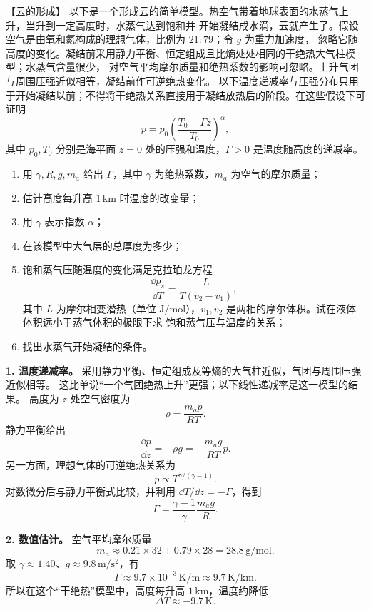 {
\begin{origexamplebox}{【云的形成】}\label{ch17:ex:s31-22-6}
以下是一个形成云的简单模型。热空气带着地球表面的水蒸气上升，当升到一定高度时，水蒸气达到饱和并
开始凝结成水滴，云就产生了。假设空气是由氧和氮构成的理想气体，比例为 $21:79$；令 $g$ 为重力加速度，
忽略它随高度的变化。凝结前采用静力平衡、恒定组成且比熵处处相同的干绝热大气柱模型；水蒸气含量很少，
对空气平均摩尔质量和绝热系数的影响可忽略。上升气团与周围压强近似相等，凝结前作可逆绝热变化。
以下温度递减率与压强分布只用于开始凝结以前；不得将干绝热关系直接用于凝结放热后的阶段。在这些假设下可证明
\[
  p=p_0\left(\frac{T_0-\Gamma z}{T_0}\right)^\alpha,
\]
其中 $p_0,T_0$ 分别是海平面 $z=0$ 处的压强和温度，$\Gamma>0$ 是温度随高度的递减率。
\begin{enumerate}[label=\arabic*.]
  \item 用 $\gamma,R,g,m_a$ 给出 $\Gamma$，其中 $\gamma$ 为绝热系数，$m_a$ 为空气的摩尔质量；
  \item 估计高度每升高 $1\,\mathrm{km}$ 时温度的改变量；
  \item 用 $\gamma$ 表示指数 $\alpha$；
  \item 在该模型中大气层的总厚度为多少；
  \item 饱和蒸气压随温度的变化满足克拉珀龙方程
  \[
    \frac{\dd p_s}{\dd T}=\frac{L}{T(v_2-v_1)},
  \]
  其中 $L$ 为摩尔相变潜热（单位 $\mathrm{J/mol}$），$v_1,v_2$ 是两相的摩尔体积。试在液体体积远小于蒸气体积的极限下求
  饱和蒸气压与温度的关系；
  \item 找出水蒸气开始凝结的条件。
\end{enumerate}

\ThQCloud
\end{origexamplebox}

\begin{xesolution}
\textbf{1. 温度递减率。} 采用静力平衡、恒定组成及等熵的大气柱近似，气团与周围压强近似相等。
这比单说“一个气团绝热上升”更强；以下线性递减率是这一模型的结果。
高度为 $z$ 处空气密度为
\[
  \rho=\frac{m_a p}{RT}.
\]
静力平衡给出
\[
  \frac{\dd p}{\dd z}=-\rho g=-\frac{m_ag}{RT}p.
\]
另一方面，理想气体的可逆绝热关系为
\[
  p\propto T^{\gamma/(\gamma-1)}.
\]
对数微分后与静力平衡式比较，并利用 $\dd T/\dd z=-\Gamma$，得到
\[
  \boxed{\Gamma=\frac{\gamma-1}{\gamma}\frac{m_ag}{R}}.
\]

\textbf{2. 数值估计。} 空气平均摩尔质量
\[
  m_a\approx0.21\times32+0.79\times28=28.8\,\mathrm{g/mol}.
\]
取 $\gamma\approx1.40$、$g\approx9.8\,\mathrm{m/s^2}$，有
\[
  \Gamma\approx9.7\times10^{-3}\,\mathrm{K/m}
  \approx9.7\,\mathrm{K/km}.
\]
所以在这个“干绝热”模型中，高度每升高 $1\,\mathrm{km}$，温度约降低
\[
  \boxed{\Delta T\approx-9.7\,\mathrm K}.
\]


\end{xesolution}}
